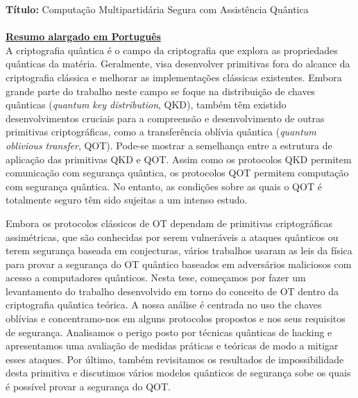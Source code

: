 \documentclass[11pt]{report}
\begin{document}
\noindent\textbf{T\'itulo:} Computa\c{c}\~{a}o Multipartid\'{a}ria Segura com Assist\^{e}ncia Qu\^{a}ntica\\\\

\noindent\underline{\textbf{Resumo alargado em Portugu\^{e}s}}\\

A criptografia quântica é o campo da criptografia que explora as propriedades quânticas da matéria. Geralmente, visa desenvolver primitivas fora do alcance da criptografia clássica e melhorar as implementações clássicas existentes. Embora grande parte do trabalho neste campo se foque na distribuição de chaves quânticas (\textit{quantum key distribution}, QKD), também têm existido desenvolvimentos cruciais para a compreensão e desenvolvimento de outras primitivas criptográficas, como a transferência oblívia quântica (\textit{quantum oblivious transfer}, QOT). Pode-se mostrar a semelhança entre a estrutura de aplicação das primitivas QKD e QOT. Assim como os protocolos QKD permitem comunicação com segurança quântica, os protocolos QOT permitem computação com segurança quântica. No entanto, as condições sobre as quais o QOT é totalmente seguro têm sido sujeitas a um intenso estudo. 

Embora os protocolos clássicos de OT dependam de primitivas criptográficas assimétricas, que são conhecidas por serem vulneráveis a ataques quânticos ou terem segurança baseada em conjecturas, vários trabalhos usaram as leis da física para provar a segurança do OT quântico baseados em adversários maliciosos com acesso a computadores quânticos. Nesta tese, começamos por fazer um levantamento do trabalho desenvolvido em torno do conceito de OT dentro da criptografia quântica teórica. A nossa análise é centrada no uso the chaves oblívias e concentramo-nos em alguns protocolos propostos e nos seus requisitos de segurança. Analisamos o perigo posto por técnicas quânticas de hacking e apresentamos uma avaliação de medidas práticas e teóricas de modo a mitigar esses ataques. Por último, também revisitamos os resultados de impossibilidade desta primitiva e discutimos vários modelos quânticos de segurança sobe os quais é possível provar a segurança do QOT.
\end{document}
